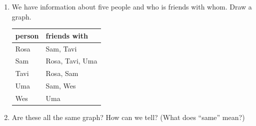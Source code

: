 \documentclass[12pt]{article}
\renewcommand{\emph}[1]{\textsf{\textbf{#1}}}
\begin{document}
\begin{enumerate}
\item We have information about five people and who is friends with whom. Draw a graph. %


\begin{minipage}[t]{0.3\linewidth}
\vspace{0pt}
\begin{tabular}{l|l}
\emph{person} & \emph{friends with} \\ \hline
Rosa & Sam, Tavi \\
Sam & Rosa, Tavi, Uma \\
Tavi & Rosa, Sam \\
Uma & Sam, Wes \\
Wes & Uma \\
\end{tabular}
\end{minipage}

\bigskip



\item  Are these all the same graph? How can we tell? (What does ``same'' mean?)


\end{enumerate}
\end{document}
